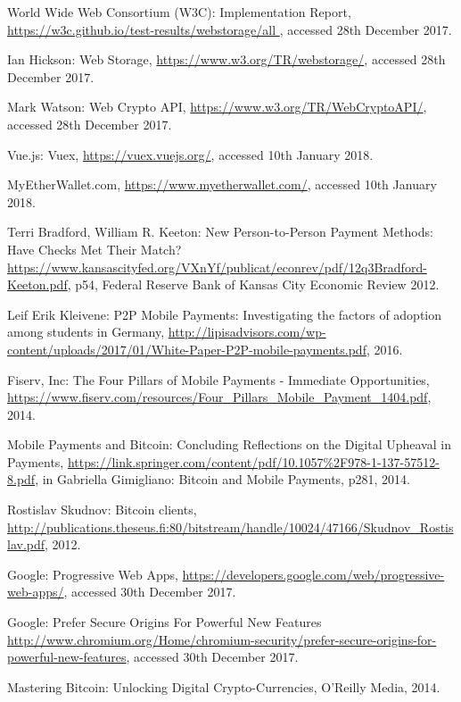 \begin{thebibliography}{99}
 World Wide Web Consortium (W3C): Implementation Report, \url{https://w3c.github.io/test-results/webstorage/all
}, accessed 28th December 2017.

 Ian Hickson: Web Storage, \url{https://www.w3.org/TR/webstorage/}, accessed 28th December 2017.

 Mark Watson: Web Crypto API, \url{https://www.w3.org/TR/WebCryptoAPI/}, accessed 28th December 2017.

 Vue.js: Vuex, \url{https://vuex.vuejs.org/}, accessed 10th January 2018.

 MyEtherWallet.com, \url{https://www.myetherwallet.com/}, accessed 10th January 2018.

 Terri Bradford, William R. Keeton: New Person-to-Person
Payment Methods: Have Checks Met Their Match?  \url{https://www.kansascityfed.org/VXnYf/publicat/econrev/pdf/12q3Bradford-Keeton.pdf}, p54, Federal Reserve Bank of Kansas City Economic Review 2012.

 Leif Erik Kleivene: P2P Mobile Payments: Investigating the factors of adoption among students in Germany, \url{http://lipisadvisors.com/wp-content/uploads/2017/01/White-Paper-P2P-mobile-payments.pdf}, 2016.

 Fiserv, Inc: The Four Pillars of Mobile Payments - Immediate Opportunities, \url{https://www.fiserv.com/resources/Four_Pillars_Mobile_Payment_1404.pdf}, 2014.

Mobile Payments and Bitcoin: Concluding Reflections on the Digital Upheaval in Payments, \url{https://link.springer.com/content/pdf/10.1057\%2F978-1-137-57512-8.pdf}, in Gabriella Gimigliano: Bitcoin and Mobile Payments, p281, 2014.

Rostislav Skudnov: Bitcoin clients, \url{http://publications.theseus.fi:80/bitstream/handle/10024/47166/Skudnov_Rostislav.pdf}, 2012.

Google: Progressive Web Apps, \url{https://developers.google.com/web/progressive-web-apps/}, accessed 30th December 2017.

Google: Prefer Secure Origins For Powerful New Features \url{http://www.chromium.org/Home/chromium-security/prefer-secure-origins-for-powerful-new-features}, accessed 30th December 2017.

Mastering Bitcoin: Unlocking Digital Crypto-Currencies, O'Reilly Media, 2014.


\end{thebibliography}
